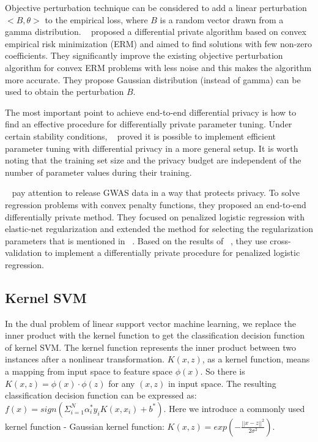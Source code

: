 \documentclass[draftclsnofoot,onecolumn,twoside]{IEEEtran}
\begin{document}
Objective perturbation technique can be considered to add a linear perturbation $<B,\theta>$ to the empirical loss, where $B$ is a random vector drawn from a gamma distribution.
~\cite{Kifer2013Private} proposed a differential private algorithm based on convex empirical risk minimization (ERM) and aimed to find solutions with few non-zero coefficients. They significantly improve the existing objective perturbation algorithm for convex ERM problems with less noise and this makes the algorithm more accurate. They propose Gaussian distribution (instead of gamma) can be used to obtain the perturbation $B$.

The most important point to achieve end-to-end differential privacy is how to find an effective procedure for differentially private parameter tuning. Under certain stability conditions, ~\cite{Chaudhuri2013A} proved it is possible to implement efficient parameter tuning with differential privacy in a more general setup. It is worth noting that the training set size and the privacy budget are independent of the number of parameter values during their training.

~\cite{Yu2014Differentially} pay attention to release GWAS data in a way that protects privacy. To solve regression problems with convex penalty functions, they proposed an end-to-end differentially  private method. They focused on penalized logistic regression with elastic-net regularization and extended the method for selecting the regularization parameters that is mentioned in ~\cite{Chaudhuri2013A}. Based on the results of ~\cite{Kifer2013Private}, they use cross-validation to implement a differentially private procedure for penalized logistic regression.




\subsection{Kernel SVM}
In the dual problem of linear support vector machine learning, we replace the inner product with the kernel function to get the classification decision function of kernel SVM. The kernel function represents the inner product between two instances after a nonlinear transformation. $K(x,z)$, as a kernel function, means a mapping from input space to feature space $\phi(x)$. So there is $K(x,z) = \phi(x) \cdot \phi(z)$ for any $(x,z)$ in input space. The resulting classification decision function can be expressed as: $f(x) = sign\left(\Sigma_{i=1}^N\alpha_{i}^*y_{i}K(x,x_i) + b^*\right)$. Here we introduce a commonly used kernel function - Gaussian kernel function: $K(x,z) = exp \left( -\frac{||x - z||^2}{ 2\sigma^2 }\right)$.
\end{document}
